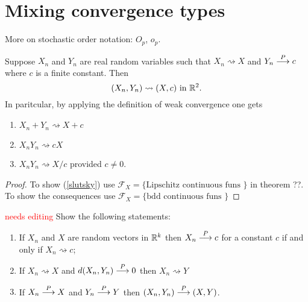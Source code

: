 \clearpage
%
%
\section{Mixing convergence types}


More on stochastic order notation: $O_p$, $o_p$.


\begin{theorem}
Suppose $X_n$ and $Y_n$ are real random variables such that $X_n\rightsquigarrow X$ and $Y_n \overset{\small P} \longrightarrow c$ where $c$ is a finite constant. Then
\begin{equation}
\label{slutsky}
 (X_n, Y_n)\rightsquigarrow (X, c) \text{ in $\Bbb R^2$.}
 \end{equation}
In paritcular, by applying the definition of weak convergence one gets
\begin{enumerate}
\item $X_n+Y_n \rightsquigarrow X + c$
\item $X_nY_n \rightsquigarrow cX$
\item $X_nY_n \rightsquigarrow X/c$ provided $c\neq 0$.
\end{enumerate}
\end{theorem}
\begin{proof}
To show (\ref{slutsky}) use $\mathcal F_X=\{\text{Lipschitz continuous funs }\}$ in theorem ??. To show the consequences use $\mathcal F_X=\{\text{bdd continuous funs }\}$
\end{proof}


\begin{exercise}
\textcolor{red}{needs editing}
 Show the following statements:
\begin{enumerate}
\item If $X_n$ and $X$ are random vectors in $\Bbb R^k$ then $X_n\overset{\small P} \longrightarrow c$ for a constant $c$ if and only if $X_n\rightsquigarrow c$;
\item If $X_n\rightsquigarrow X$ and $d(X_n, Y_n)\overset{\small P} \longrightarrow 0$ then $X_n\rightsquigarrow Y$
\item If  $X_n \overset{\small P} \longrightarrow X$ and  $Y_n \overset{\small P} \longrightarrow Y$ then $(X_n,Y_n)\overset{\small P} \longrightarrow (X,Y)$.
\end{enumerate}
\end{exercise}
